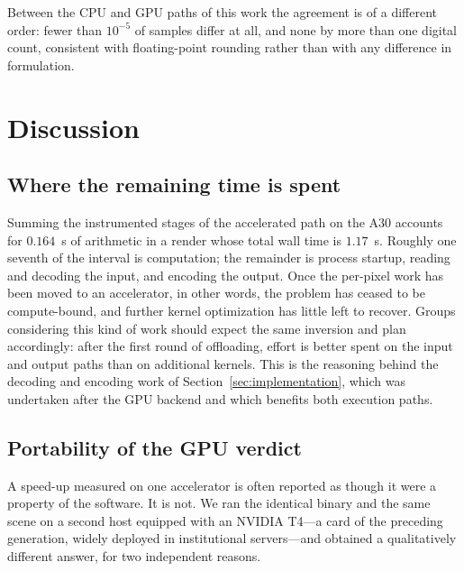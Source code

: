 \documentclass{ametsocV6.1}
\begin{document}
Between the CPU and GPU paths of this work the agreement is of a different
order: fewer than $10^{-5}$ of samples differ at all, and none by more than one
digital count, consistent with floating-point rounding rather than with any
difference in formulation.

\section{Discussion}
\label{sec:discussion}

\subsection{Where the remaining time is spent}
\label{sec:timebudget}

Summing the instrumented stages of the accelerated path on the A30 accounts for
$0.164$~s of arithmetic in a render whose total wall time is $1.17$~s. Roughly
one seventh of the interval is computation; the remainder is process startup,
reading and decoding the input, and encoding the output. Once the per-pixel
work has been moved to an accelerator, in other words, the problem has ceased
to be compute-bound, and further kernel optimization has little left to
recover. Groups considering this kind of work should expect the same inversion
and plan accordingly: after the first round of offloading, effort is better
spent on the input and output paths than on additional kernels. This is the
reasoning behind the decoding and encoding work of
Section~\ref{sec:implementation}, which was undertaken after the GPU backend
and which benefits both execution paths.

\subsection{Portability of the GPU verdict}
\label{sec:portability}

A speed-up measured on one accelerator is often reported as though it were a
property of the software. It is not. We ran the identical binary and the same
scene on a second host equipped with an NVIDIA T4---a card of the preceding
generation, widely deployed in institutional servers---and obtained a
qualitatively different answer, for two independent reasons.
\end{document}
